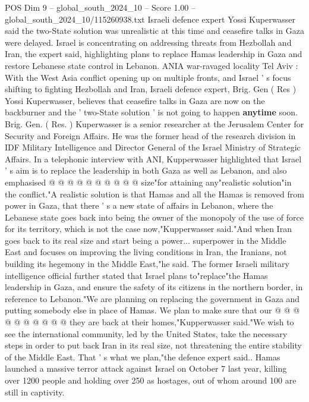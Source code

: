 \begin{textsample}{POS Dim 9 – global\_south\_2024\_10 – Score 1.00 – global\_south\_2024\_10/115260938.txt}  \label{ex:f9_pos_171}
Israeli defence expert Yossi Kuperwasser said the two-State solution was unrealistic at this time and ceasefire talks in Gaza were delayed.
Israel is concentrating on addressing threats from Hezbollah and Iran, the expert said, highlighting plans to replace Hamas leadership in Gaza and restore Lebanese state control in Lebanon.
ANIA war-ravaged locality Tel Aviv : With the West Asia conflict opening up on multiple fronts, and Israel ' s focus shifting to fighting Hezbollah and Iran, Israeli defence expert, Brig.
Gen ( Res ) Yossi Kuperwasser, believes that ceasefire talks in Gaza are now on the backburner and the ' two-State solution ' is not going to happen \textbf{anytime} soon.
Brig.
Gen. ( Res. ) Kuperwasser is a senior researcher at the Jerusalem Center for Security and Foreign Affairs.
He was the former head of the research division in IDF Military Intelligence and Director General of the Israel Ministry of Strategic Affairs.
In a telephonic interview with ANI, Kupperwasser highlighted that Israel ' s aim is to replace the leadership in both Gaza as well as Lebanon, and also emphasised @ @ @ @ @ @ @ @ @ @ size"for attaining any"realistic solution"in the conflict."A realistic solution is that Hamas and all the Hamas is removed from power in Gaza, that there ' s a new state of affairs in Lebanon, where the Lebanese state goes back into being the owner of the monopoly of the use of force for its territory, which is not the case now,"Kupperwasser said."And when Iran goes back to its real size and start being a power... superpower in the Middle East and focuses on improving the living conditions in Iran, the Iranians, not building its hegemony in the Middle East,"he said.
The former Israeli military intelligence official further stated that Israel plans to"replace"the Hamas leadership in Gaza, and ensure the safety of its citizens in the northern border, in reference to Lebanon."We are planning on replacing the government in Gaza and putting somebody else in place of Hamas.
We plan to make sure that our @ @ @ @ @ @ @ @ @ @ they are back at their homes,"Kupperwasser said."We wish to see the international community, led by the United States, take the necessary steps in order to put back Iran in its real size, not threatening the entire stability of the Middle East.
That ' s what we plan,"the defence expert said..
Hamas launched a massive terror attack against Israel on October 7 last year, killing over 1200 people and holding over 250 as hostages, out of whom around 100 are still in captivity.

\end{textsample}
